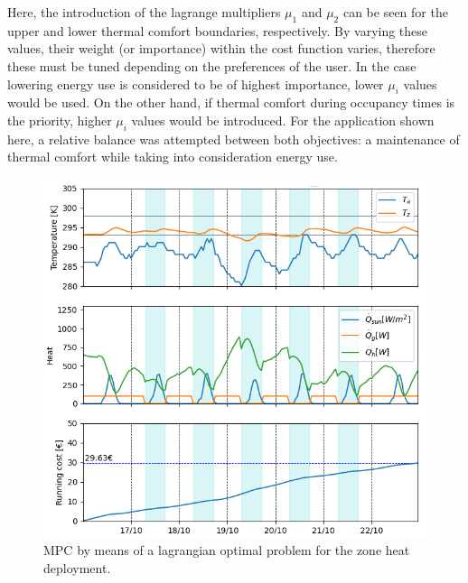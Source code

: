 Here, the introduction of the lagrange multipliers $\mu_1$ and $\mu_2$ can be seen for the upper and lower thermal comfort boundaries, respectively. By varying these values, their weight (or importance) within the cost function varies, therefore these must be tuned depending on the preferences of the user. In the case lowering energy use is considered to be of highest importance, lower $\mu_i$ values would be used. On the other hand, if thermal comfort during occupancy times is the priority, higher $\mu_i$ values would be introduced. For the application shown here, a relative balance was attempted between both objectives: a maintenance of thermal comfort while taking into consideration energy use. 


\begin{figure}[H]
\centering
\includegraphics[scale=0.8]{images/mpc_lagrangian.png}
\caption{MPC by means of a lagrangian optimal problem for the zone heat deployment.}
\label{fig:mpc_lagrangian}
\end{figure}

